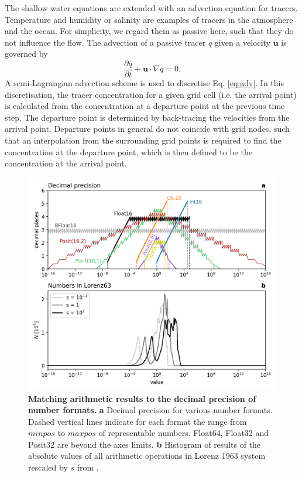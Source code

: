 The shallow water equations are extended with an advection equation for tracers. Temperature and humidity or salinity are examples
of tracers in the atmosphere and the ocean. For simplicity, we regard them as passive here, such that they do not influence the flow.
The advection of a passive tracer $q$ given a velocity $\mathbf{u}$ is governed by
\begin{equation}
\frac{\partial q}{\partial t} + \mathbf{u} \cdot \nabla q = 0.
\label{eq:adv}
\end{equation}
A semi-Lagrangian advection scheme \citep{Smolarkiewicz1992} is used to discretise Eq. \ref{eq:adv}. In this discretisation, the tracer
concentration for a given grid cell (i.e. the arrival point) is calculated from the concentration at a departure point at the previous time step.
The departure point is determined by back-tracing the velocities from the arrival point. Departure points in general do not coincide with
grid nodes, such that an interpolation from the surrounding grid points is required to find the concentration at the departure point, which
is then defined to be the concentration at the arrival point.

\begin{figure}[htbp]
\includegraphics[width=1\textwidth]{Figures/swm/decimal_precision.png}
\caption{\textbf{Matching arithmetic results to the decimal precision of number formats.}
\textbf{a} Decimal precision for various number formats. Dashed vertical lines indicate for each format the range from $minpos$ to
$maxpos$ of representable numbers. Float64, Float32 and Posit32 are beyond the axes limits. \textbf{b} Histogram of results
of the absolute values of all arithmetic operations in Lorenz 1963 system rescaled by $s$ from \citep{Klower2019a}.}
\label{fig:swm_dec_prec}
\end{figure}

